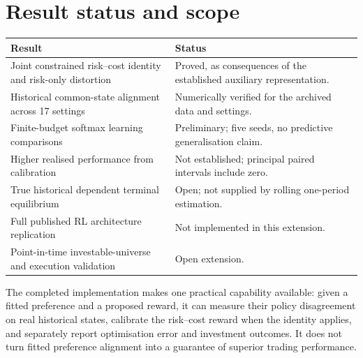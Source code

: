 \documentclass[11pt,a4paper]{article}
\begin{document}
\newpage
\section{Result status and scope}
\begin{longtable}{p{}p{}}\toprule Result & Status\\\midrule
Joint constrained risk--cost identity and risk-only distortion & Proved, as consequences of the established auxiliary representation.\\
Historical common-state alignment across 17 settings & Numerically verified for the archived data and settings.\\
Finite-budget softmax learning comparisons & Preliminary; five seeds, no predictive generalisation claim.\\
Higher realised performance from calibration & Not established; principal paired intervals include zero.\\
True historical dependent terminal equilibrium & Open; not supplied by rolling one-period estimation.\\
Full published RL architecture replication & Not implemented in this extension.\\
Point-in-time investable-universe and execution validation & Open extension.\\\bottomrule
\end{longtable}
The completed implementation makes one practical capability available: given a fitted preference and a proposed reward, it can measure their policy disagreement on real historical states, calibrate the risk--cost reward when the identity applies, and separately report optimisation error and investment outcomes. It does not turn fitted preference alignment into a guarantee of superior trading performance.
\end{document}
